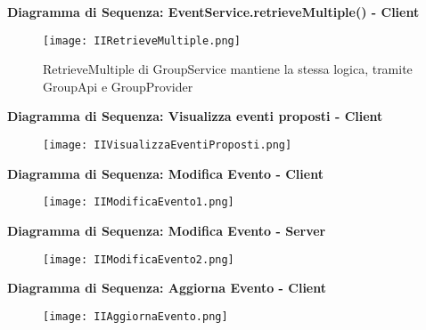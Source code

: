 \textbf{Diagramma di Sequenza: EventService.retrieveMultiple() - Client}\\
\begin{figure}[h!]
    \begin{center}
        \begin{minipage}{0.5\textwidth}
            \texttt{[image: IIRetrieveMultiple.png]}
        \end{minipage}
        \begin{minipage}{0.4\textwidth}
            RetrieveMultiple di GroupService mantiene la stessa logica, tramite GroupApi e GroupProvider
        \end{minipage}
    \end{center}
\end{figure}
\clearpage

\textbf{Diagramma di Sequenza: Visualizza eventi proposti - Client}\\
\begin{figure}[h!]
    \begin{center}
        \texttt{[image: IIVisualizzaEventiProposti.png]}
    \end{center}
\end{figure}
\clearpage
\textbf{Diagramma di Sequenza: Modifica Evento - Client}\\
\begin{figure}[h!]
    \begin{center}
        \texttt{[image: IIModificaEvento1.png]}
    \end{center}
\end{figure}

\textbf{Diagramma di Sequenza: Modifica Evento - Server}\\

\begin{figure}[h!]
    \begin{center}
        \texttt{[image: IIModificaEvento2.png]}
    \end{center}
\end{figure}
\clearpage
\textbf{Diagramma di Sequenza: Aggiorna Evento - Client}\\
\begin{figure}[h!]
    \begin{center}
        \texttt{[image: IIAggiornaEvento.png]}
    \end{center}
\end{figure}

